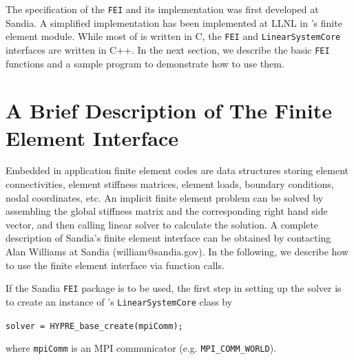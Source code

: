 The specification of the {\tt FEI} and its implementation was first
developed at Sandia. A simplified implementation has been implemented
at LLNL in \hypre{}'s finite element module. While most of \hypre{}
is written in C, the {\tt FEI} and {\tt LinearSystemCore}
interfaces are written in C++. In the next section, we 
describe the basic {\tt FEI} functions and a sample program to 
demonstrate how to use them. 

\section{A Brief Description of The Finite Element Interface}

Embedded in application finite element codes are data structures
storing element connectivities, element stiffness matrices, element
loads, boundary conditions, nodal coordinates, etc. An implicit finite
element problem can be solved by assembling the global stiffness matrix
and the corresponding right hand side vector, and then calling linear
solver to calculate the solution. A complete description of Sandia's
finite element interface can be obtained by contacting Alan Williams
at Sandia (william@sandia.gov). In the following, we describe how
to use the finite element interface via \hypre{} function calls.

If the Sandia {\tt FEI} package is to be used, the first step in
setting up the solver is to create an instance of \hypre{}'s
{\tt LinearSystemCore} class by
\begin{tabbing}
\hspace{0.5in} \= {\tt solver = HYPRE\_base\_create(mpiComm);}
\end{tabbing}
where {\tt mpiComm} is an MPI communicator (e.g. {\tt MPI\_COMM\_WORLD}).

